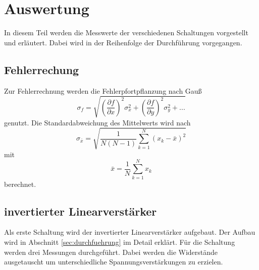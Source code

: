 \section{Auswertung}
\label{sec:auswertung}
In diesem Teil werden die Messwerte der verschiedenen Schaltungen vorgestellt und erläutert.
Dabei wird in der Reihenfolge der Durchführung vorgegangen.
\subsection{Fehlerrechung}
Zur Fehlerrechnung werden die Fehlerpfortpflanzung nach Gauß
\begin{equation}
    \sigma_f = \sqrt{\left(\frac{\partial f}{\partial x}\right)^2 \sigma_x ^2 + \left( \frac{\partial f}{\partial y}\right)^2 \sigma_y ^2 + ...}
\end{equation}
genutzt.
Die Standardabweichung des Mittelwerts wird nach
\begin{equation}
    \sigma_{\bar{x}} = \sqrt{\frac{1}{N(N-1)} \sum_{k=1}^N (x_k - \bar{x})^2}
\end{equation}
mit 
\begin{equation}
    \bar{x} = \frac{1}{N} \sum_{k=1} ^N x_k
\end{equation}
berechnet.
\subsection{invertierter Linearverstärker}
Als erste Schaltung wird der invertierter Linearverstärker aufgebaut.
Der Aufbau wird in Abschnitt \ref{sec:durchfuehrung} im Detail erklärt.
Für die Schaltung werden drei Messungen durchgeführt.
Dabei werden die Widerstände ausgetauscht um unterschiedliche Spannungsverstärkungen zu erzielen.

